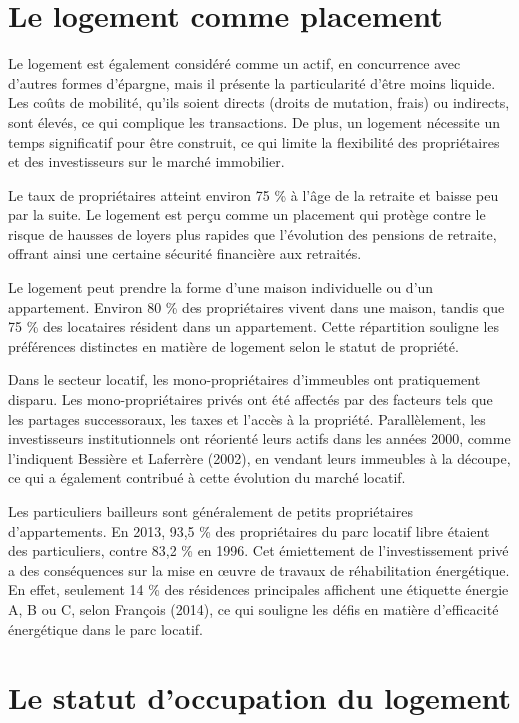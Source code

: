 \documentclass[a4paper, 12pt]{report}
\begin{document}
\section{Le logement comme placement}

Le logement est également considéré comme un actif, en concurrence avec d'autres formes d’épargne, mais il présente la particularité d’être moins liquide. Les coûts de mobilité, qu'ils soient directs (droits de mutation, frais) ou indirects, sont élevés, ce qui complique les transactions. De plus, un logement nécessite un temps significatif pour être construit, ce qui limite la flexibilité des propriétaires et des investisseurs sur le marché immobilier.

Le taux de propriétaires atteint environ 75 \% à l’âge de la retraite et baisse peu par la suite. Le logement est perçu comme un placement qui protège contre le risque de hausses de loyers plus rapides que l’évolution des pensions de retraite, offrant ainsi une certaine sécurité financière aux retraités.

Le logement peut prendre la forme d'une maison individuelle ou d'un appartement. Environ 80 \% des propriétaires vivent dans une maison, tandis que 75 \% des locataires résident dans un appartement. Cette répartition souligne les préférences distinctes en matière de logement selon le statut de propriété.

Dans le secteur locatif, les mono-propriétaires d’immeubles ont pratiquement disparu. Les mono-propriétaires privés ont été affectés par des facteurs tels que les partages successoraux, les taxes et l'accès à la propriété. Parallèlement, les investisseurs institutionnels ont réorienté leurs actifs dans les années 2000, comme l'indiquent Bessière et Laferrère (2002), en vendant leurs immeubles à la découpe, ce qui a également contribué à cette évolution du marché locatif.

Les particuliers bailleurs sont généralement de petits propriétaires d’appartements. En 2013, 93,5 \% des propriétaires du parc locatif libre étaient des particuliers, contre 83,2 \% en 1996. Cet émiettement de l’investissement privé a des conséquences sur la mise en œuvre de travaux de réhabilitation énergétique. En effet, seulement 14 \% des résidences principales affichent une étiquette énergie A, B ou C, selon François (2014), ce qui souligne les défis en matière d'efficacité énergétique dans le parc locatif.

\section{Le statut d'occupation du logement}
\end{document}
